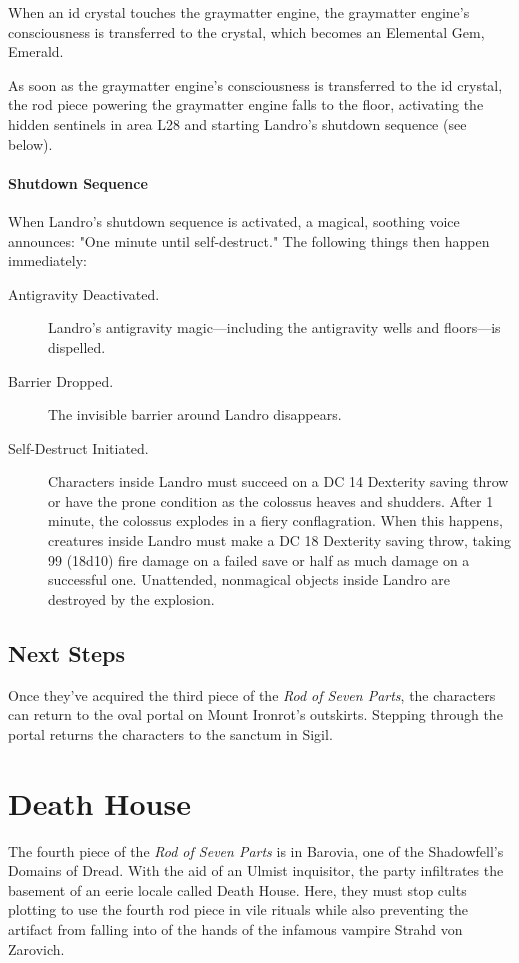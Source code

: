 \documentclass[10pt,a4paper,twoside,bg=print,twocolumn,openany,nodeprecatedcode]{dndbook}
\begin{document}
When an id crystal touches the graymatter engine, the graymatter engine's consciousness is transferred to the crystal, which becomes an Elemental Gem, Emerald.

As soon as the graymatter engine's consciousness is transferred to the id crystal, the rod piece powering the graymatter engine falls to the floor, activating the hidden sentinels in area L28 and starting Landro's shutdown sequence (see below).

\subsubsection{Shutdown Sequence}
When Landro's shutdown sequence is activated, a magical, soothing voice announces: "One minute until self-destruct." The following things then happen immediately:


\begin{description}
\item[Antigravity Deactivated.]
Landro's antigravity magic—including the antigravity wells and floors—is dispelled.
\item[Barrier Dropped.]
The invisible barrier around Landro disappears.
\item[Self-Destruct Initiated.]
Characters inside Landro must succeed on a DC 14 Dexterity saving throw or have the prone condition as the colossus heaves and shudders. After 1 minute, the colossus explodes in a fiery conflagration. When this happens, creatures inside Landro must make a DC 18 Dexterity saving throw, taking 99 (18d10) fire damage on a failed save or half as much damage on a successful one. Unattended, nonmagical objects inside Landro are destroyed by the explosion.
\end{description}

\section{Next Steps}
Once they've acquired the third piece of the \textit{Rod of Seven Parts}, the characters can return to the oval portal on Mount Ironrot's outskirts. Stepping through the portal returns the characters to the sanctum in Sigil.

\chapter{Death House}
The fourth piece of the \textit{Rod of Seven Parts} is in Barovia, one of the Shadowfell's Domains of Dread. With the aid of an Ulmist inquisitor, the party infiltrates the basement of an eerie locale called Death House. Here, they must stop cults plotting to use the fourth rod piece in vile rituals while also preventing the artifact from falling into of the hands of the infamous vampire Strahd von Zarovich.
\end{document}
